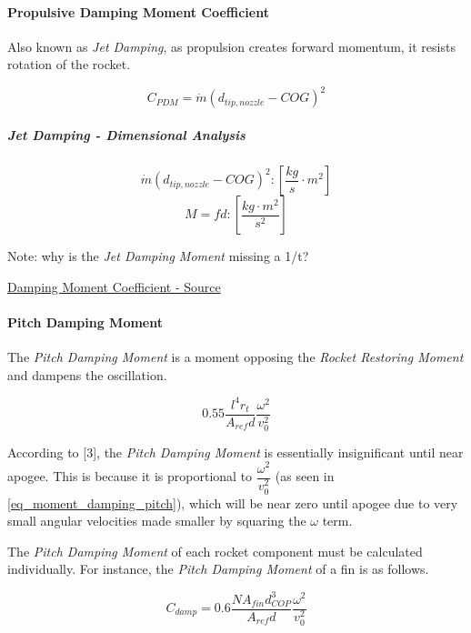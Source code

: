 \documentclass[]{article}
\let\oldparagraph\paragraph
\renewcommand{\paragraph}[1]{\oldparagraph{#1}\mbox{}}
\let\oldsubparagraph\subparagraph
\renewcommand{\subparagraph}[1]{\oldsubparagraph{#1}\mbox{}}
\begin{document}
\paragraph{Propulsive Damping Moment
Coefficient}\label{propulsive-damping-moment-coefficient}

Also known as \emph{Jet Damping}, as propulsion creates forward
momentum, it resists rotation of the rocket.

\begin{equation}
\label{eq_coef_moment_damping_jet}
C_{PDM} = \dot{m} \left( d_{tip,nozzle} - COG \right) ^2
\end{equation}

\subparagraph{Jet Damping - Dimensional
Analysis}\label{jet-damping---dimensional-analysis}

\[
\dot{m} \left( d_{tip,nozzle} - COG \right) ^2 :
\left[ \dfrac{kg}{s} \cdot m^2 \right]
\] \[
M = fd : 
\left[ \dfrac{kg \cdot m^2}{s^2} \right]
\]

Note: why is the \emph{Jet Damping Moment} missing a 1/t?

\href{https://www.apogeerockets.com/education/downloads/Newsletter195.pdf}{Damping
Moment Coefficient - Source}

\paragraph{Pitch Damping Moment}\label{pitch-damping-moment}

The \emph{Pitch Damping Moment} is a moment opposing the \emph{Rocket
Restoring Moment} and dampens the oscillation.

\begin{equation}
\label{eq_moment_damping_pitch}
0.55 \dfrac{l^4 r_t}{A_{ref} d} \dfrac{\omega^2}{v^2_0}
\end{equation}

According to {[}3{]}, the \emph{Pitch Damping Moment} is essentially
insignificant until near apogee. This is because it is proportional to
\(\dfrac{\omega^2}{v^2_0}\) (as seen in \ref{eq_moment_damping_pitch}),
which will be near zero until apogee due to very small angular
velocities made smaller by squaring the \(\omega\) term.

The \emph{Pitch Damping Moment} of each rocket component must be
calculated individually. For instance, the \emph{Pitch Damping Moment}
of a fin is as follows.

\begin{equation}
\label{eq_moment_damping_pitch_fin}
C_{damp} = 0.6 \dfrac{N A_{fin} d_{COP}^3}{A_{ref} d} \dfrac{\omega^2}{v^2_0}
\end{equation}
\end{document}
